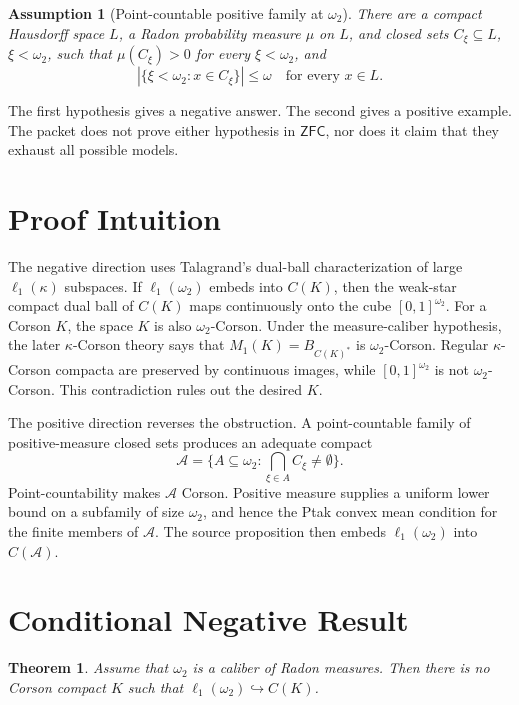 \documentclass[11pt]{article}
\newtheorem{theorem}{Theorem}
\newtheorem{assumption}{Assumption}
\newcommand{\ZFC}{\mathsf{ZFC}}
\newcommand{\ellone}{\ell_1}
\newcommand{\omegatwo}{\omega_2}
\newcommand{\cA}{\mathcal{A}}
\newcommand{\embed}{\hookrightarrow}
\begin{document}
\begin{assumption}[Point-countable positive family at \(\omegatwo\)]
There are a compact Hausdorff space \(L\), a Radon probability measure
\(\mu\) on \(L\), and closed sets \(C_\xi\subseteq L\), \(\xi<\omegatwo\),
such that \(\mu(C_\xi)>0\) for every \(\xi<\omegatwo\), and
\[
|\{\xi<\omegatwo:x\in C_\xi\}|\le \omega
\quad\text{for every }x\in L.
\]
\end{assumption}

The first hypothesis gives a negative answer.  The second gives a positive
example.  The packet does not prove either hypothesis in \(\ZFC\), nor does it
claim that they exhaust all possible models.

\section*{Proof Intuition}

The negative direction uses Talagrand's dual-ball characterization of
large \(\ellone(\kappa)\) subspaces.  If \(\ellone(\omegatwo)\) embeds into
\(C(K)\), then the weak-star compact dual ball of \(C(K)\) maps continuously
onto the cube \([0,1]^{\omegatwo}\).  For a Corson \(K\), the space \(K\) is
also \(\omegatwo\)-Corson.  Under the measure-caliber hypothesis, the later
\(\kappa\)-Corson theory says that \(M_1(K)=B_{C(K)^*}\) is
\(\omegatwo\)-Corson.  Regular \(\kappa\)-Corson compacta are preserved by
continuous images, while \([0,1]^{\omegatwo}\) is not
\(\omegatwo\)-Corson.  This contradiction rules out the desired \(K\).

The positive direction reverses the obstruction.  A point-countable family of
positive-measure closed sets produces an adequate compact
\[
\cA=\{A\subseteq \omegatwo:\bigcap_{\xi\in A} C_\xi\ne\emptyset\}.
\]
Point-countability makes \(\cA\) Corson.  Positive measure supplies a uniform
lower bound on a subfamily of size \(\omegatwo\), and hence the Ptak convex
mean condition for the finite members of \(\cA\).  The source proposition then
embeds \(\ellone(\omegatwo)\) into \(C(\cA)\).

\section*{Conditional Negative Result}

\begin{theorem}\label{thm:negative}
Assume that \(\omegatwo\) is a caliber of Radon measures.  Then there is no
Corson compact \(K\) such that \(\ellone(\omegatwo)\embed C(K)\).
\end{theorem}
\end{document}
